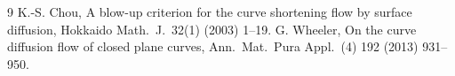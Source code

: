 \documentclass[11pt]{article}
\begin{document}
\begin{thebibliography}{9}
 K.-S. Chou, A blow-up criterion for the curve shortening flow by surface diffusion, Hokkaido Math.\ J.\ 32(1) (2003) 1--19.
 G. Wheeler, On the curve diffusion flow of closed plane curves, Ann.\ Mat.\ Pura Appl.\ (4) 192 (2013) 931--950.
\end{thebibliography}
\end{document}
